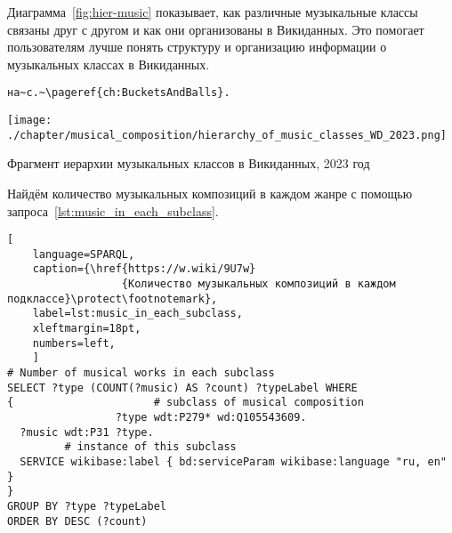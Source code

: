 Диаграмма~\ref{fig:hier-music} показывает, как различные музыкальные классы связаны друг с другом и как они организованы в Викиданных. Это помогает пользователям лучше понять структуру и организацию информации о музыкальных классах в Викиданных.

\begin{verbatim}
на~с.~\pageref{ch:BucketsAndBalls}. 
\end{verbatim}




\begin{marginfigure}[0\baselineskip]
	\texttt{[image: ./chapter/musical\_composition/hierarchy\_of\_music\_classes\_WD\_2023.png]}
	\caption[Иерархия музыкальных классов]{Фрагмент иерархии музыкальных классов в Викиданных, 2023 год}%
	\label{fig:hier-music}%
\end{marginfigure}
Найдём количество музыкальных композиций в каждом жанре с помощью запроса~\ref{lst:music_in_each_subclass}.

\begin{lstlisting}[ 
    language=SPARQL,
    caption={\href{https://w.wiki/9U7w}
                  {Количество музыкальных композиций в каждом подклассе}\protect\footnotemark},
    label=lst:music_in_each_subclass,
    xleftmargin=18pt,
    numbers=left,
    ]
# Number of musical works in each subclass
SELECT ?type (COUNT(?music) AS ?count) ?typeLabel WHERE 
{                      # subclass of musical composition
                 ?type wdt:P279* wd:Q105543609.      
  ?music wdt:P31 ?type.
         # instance of this subclass
  SERVICE wikibase:label { bd:serviceParam wikibase:language "ru, en" }
}
GROUP BY ?type ?typeLabel
ORDER BY DESC (?count)
\end{lstlisting}%

